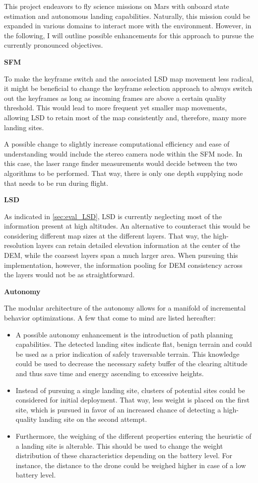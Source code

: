 This project endeavors to fly science missions on Mars with onboard state estimation and autonomous landing capabilities. Naturally, this mission could be expanded in various domains to interact more with the environment. However, in the following, I will outline possible enhancements for this approach to pursue the currently pronounced objectives.

\textbf{SFM}

To make the keyframe switch and the associated LSD map movement less radical, it might be beneficial to change the keyframe selection approach to always switch out the keyframes as long as incoming frames are above a certain quality threshold. This would lead to more frequent yet smaller map movements, allowing LSD to retain most of the map consistently and, therefore, many more landing sites.

A possible change to slightly increase computational efficiency and ease of understanding would include the stereo camera node within the SFM node. In this case, the laser range finder measurements would decide between the two algorithms to be performed. That way, there is only one depth supplying node that needs to be run during flight.

\textbf{LSD}

As indicated in \cref{sec:eval_LSD}, LSD is currently neglecting most of the information present at high altitudes. An alternative to counteract this would be considering different map sizes at the different layers. That way, the high-resolution layers can retain detailed elevation information at the center of the DEM, while the coarsest layers span a much larger area. When pursuing this implementation, however, the information pooling for DEM consistency across the layers would not be as straightforward.

\textbf{Autonomy}

The modular architecture of the autonomy allows for a manifold of incremental behavior optimizations. A few that come to mind are listed hereafter:

\begin{itemize}
    \item A possible autonomy enhancement is the introduction of path planning capabilities. The detected landing sites indicate flat, benign terrain and could be used as a prior indication of safely traversable terrain. This knowledge could be used to decrease the necessary safety buffer of the clearing altitude and thus save time and energy ascending to excessive heights.
    \item Instead of pursuing a single landing site, clusters of potential sites could be considered for initial deployment. That way, less weight is placed on the first site, which is pursued in favor of an increased chance of detecting a high-quality landing site on the second attempt.
    \item Furthermore, the weighing of the different properties entering the heuristic of a landing site is alterable. This should be used to change the weight distribution of these characteristics depending on the battery level. For instance, the distance to the drone could be weighed higher in case of a low battery level.
\end{itemize}

